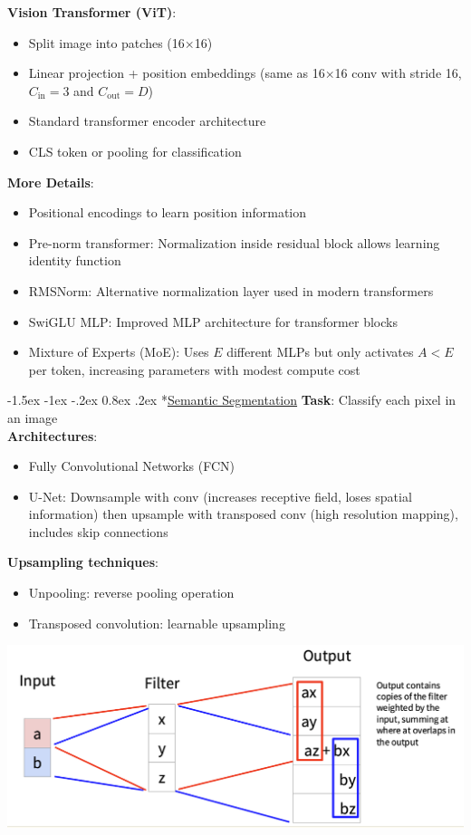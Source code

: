 \documentclass{article}
\makeatletter
\renewcommand\section{\@startsection{section}{1}{\z@}%
                                  {-1.5ex \@plus -1ex \@minus -.2ex}%
                                  {0.8ex \@plus.2ex}%
                                  {\normalfont\small\bfseries}}
\makeatother
\begin{document}
\begin{multicols}{3}
\textbf{Vision Transformer (ViT)}:
\begin{itemize}
\item Split image into patches (16×16)
\item Linear projection + position embeddings (same as 16×16 conv with stride 16, $C_{\text{in}} = 3$ and $C_{\text{out}} = D$)
\item Standard transformer encoder architecture
\item CLS token or pooling for classification
\end{itemize}

\textbf{More Details}:
\begin{itemize}
\item Positional encodings to learn position information
\item Pre-norm transformer: Normalization inside residual block allows learning identity function
\item RMSNorm: Alternative normalization layer used in modern transformers
\item SwiGLU MLP: Improved MLP architecture for transformer blocks
\item Mixture of Experts (MoE): Uses $E$ different MLPs but only activates $A < E$ per token, increasing parameters with modest compute cost
\end{itemize}

\section*{\underline{Semantic Segmentation}}
\textbf{Task}: Classify each pixel in an image\\
\textbf{Architectures}:
\begin{itemize}
\item Fully Convolutional Networks (FCN)
\item U-Net: Downsample with conv (increases receptive field, loses spatial information) then upsample with transposed conv (high resolution mapping), includes skip connections
\end{itemize}

\textbf{Upsampling techniques}:
\begin{itemize}
\item Unpooling: reverse pooling operation
\item Transposed convolution: learnable upsampling
\end{itemize}
\includegraphics[width=\columnwidth]{imgs/upsampl.png}


\end{multicols}
\end{document}

